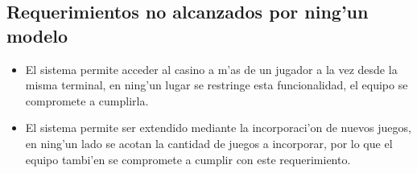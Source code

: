 \subsection{Requerimientos no alcanzados por ning'un modelo \label{RND}}

\begin{itemize}
\item {} El sistema permite acceder al casino a m'as de un jugador a la vez desde la misma terminal, en ning'un lugar se restringe esta funcionalidad, el equipo se compromete a cumplirla.
\item {} El sistema permite ser extendido mediante la incorporaci'on de nuevos juegos, en ning'un lado se acotan la cantidad de juegos a incorporar, por lo que el equipo tambi'en se compromete a cumplir con este requerimiento.

 
\end{itemize}
